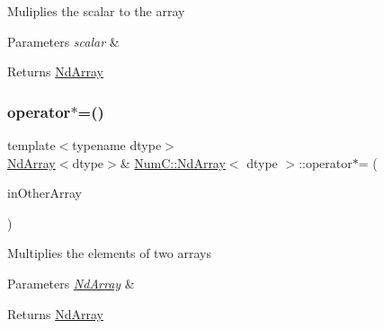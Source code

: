 Muliplies the scalar to the array


\begin{DoxyParams}{Parameters}
{\em scalar} & \\
\hline
\end{DoxyParams}
\begin{DoxyReturn}{Returns}
\mbox{\hyperlink{class_num_c_1_1_nd_array}{Nd\+Array}} 
\end{DoxyReturn}
\mbox{\label{class_num_c_1_1_nd_array_ad3aafa9b18db12bf67f9f1e1795a6043}} 
\subsubsection{\texorpdfstring{operator$\ast$=()}{operator*=()}\hspace{0.1cm}{\footnotesize\ttfamily [1/2]}}
{\footnotesize\ttfamily template$<$typename dtype$>$ \\
\mbox{\hyperlink{class_num_c_1_1_nd_array}{Nd\+Array}}$<$dtype$>$\& \mbox{\hyperlink{class_num_c_1_1_nd_array}{Num\+C\+::\+Nd\+Array}}$<$ dtype $>$\+::operator$\ast$= (\begin{DoxyParamCaption}\item[{const \mbox{\hyperlink{class_num_c_1_1_nd_array}{Nd\+Array}}$<$ dtype $>$ \&}]{in\+Other\+Array }\end{DoxyParamCaption})\hspace{0.3cm}{\ttfamily [inline]}}

Multiplies the elements of two arrays


\begin{DoxyParams}{Parameters}
{\em \mbox{\hyperlink{class_num_c_1_1_nd_array}{Nd\+Array}}} & \\
\hline
\end{DoxyParams}
\begin{DoxyReturn}{Returns}
\mbox{\hyperlink{class_num_c_1_1_nd_array}{Nd\+Array}} 
\end{DoxyReturn}
\mbox{\label{class_num_c_1_1_nd_array_ac6da3d583de0971629230e8d612dacb5}} 
